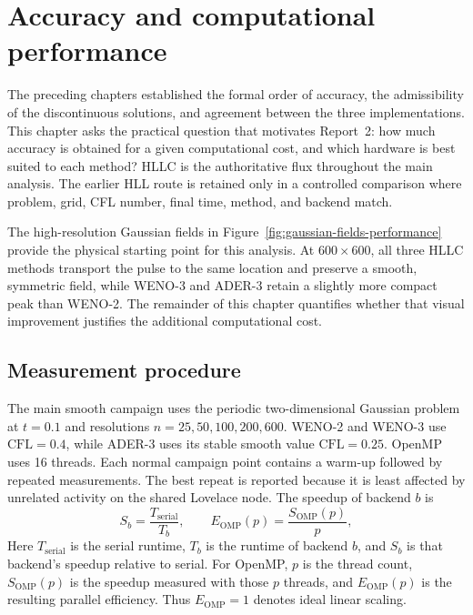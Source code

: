 \chapter{Accuracy and computational performance}
\label{chap:performance}

The preceding chapters established the formal order of accuracy, the admissibility of the
discontinuous solutions, and agreement between the three implementations.  This chapter
asks the practical question that motivates Report~2: how much accuracy is obtained for a
given computational cost, and which hardware is best suited to each method?  HLLC is the
authoritative flux throughout the main analysis.  The earlier HLL route is retained only in
a controlled comparison where problem, grid, CFL number, final time, method, and backend
match.

The high-resolution Gaussian fields in Figure~\ref{fig:gaussian-fields-performance}
provide the physical starting point for this analysis. At \(600\times600\), all three HLLC
methods transport the pulse to the same location and preserve a smooth, symmetric field,
while WENO-3 and ADER-3 retain a slightly more compact peak than WENO-2. The remainder
of this chapter quantifies whether that visual improvement justifies the additional
computational cost.

\section{Measurement procedure}

The main smooth campaign uses the periodic two-dimensional Gaussian problem at
\(t=0.1\) and resolutions \(n=25,50,100,200,600\).  WENO-2 and WENO-3 use
\(\mathrm{CFL}=0.4\), while ADER-3 uses its stable smooth value
\(\mathrm{CFL}=0.25\).  OpenMP uses 16 threads.  Each normal campaign point contains a
warm-up followed by repeated measurements. The best repeat is reported because it is least
affected by unrelated activity on the shared Lovelace node.  The speedup of backend \(b\)
is
\begin{equation}
  S_b = \frac{T_{\mathrm{serial}}}{T_b},
  \qquad
  E_{\mathrm{OMP}}(p)=\frac{S_{\mathrm{OMP}}(p)}{p},
  \label{eq:speedup-efficiency}
\end{equation}
Here \(T_{\mathrm{serial}}\) is the serial runtime, \(T_b\) is the runtime of
backend \(b\), and \(S_b\) is that backend's speedup relative to serial.
For OpenMP, \(p\) is the thread count, \(S_{\mathrm{OMP}}(p)\) is the speedup
measured with those \(p\) threads, and \(E_{\mathrm{OMP}}(p)\) is the resulting
parallel efficiency. Thus \(E_{\mathrm{OMP}}=1\) denotes ideal linear scaling.

